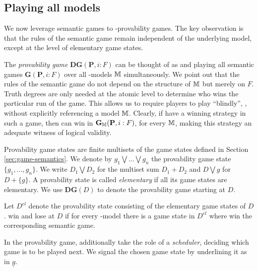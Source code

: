 \subsection{Playing all models}
We now leverage semantic games to \PNL-provability games. The key observation is that the rules of the semantic game remain independent of the underlying model, except at the level of elementary game states.

The {\em provability game}
$\mathbf{DG}(\mathbf{P},i:F )$ can be thought of as \Me and \You playing all
semantic games $\mathbf{G}(\mathbf{P},i:F )$ over all \PNL-models $\mathbb{M}$
simultaneously. We point out that  the rules of the semantic game do not depend on the structure
of $\mathbb{M}$ but merely on $F $. Truth degrees are only needed at the atomic level
to determine who wins the particular run of the game. This allows us to require
players to play ``blindly'', \ie, without explicitly referencing  a model $\mathbb{M}$.
Clearly, if \Ic have a winning strategy in such a game, then \Ic can win in
$\mathbf{G}_{\mathbb{M}}(\mathbf{P},i:F )$, for every $\mathbb{M}$, making this strategy an
adequate witness of logical validity. 

Provability game states are finite multisets of the game states
defined in Section \ref{sec:game-semantics}. We denote by $g_1 \bigvee ... \bigvee g_n$ 
 the provability game state $\{g_1,...,g_n\}$.
We write $D_1 \bigvee D_2$ for the
multiset sum $D_1+D_2$ and $D\bigvee g$ for $D+\{g\}$. A provability state is
called \emph{elementary} if all its game states are elementary.
We use $\mathbf{DG}(D)$ to denote the provability game starting at $D$. 

\begin{definition}\label{def:win}
Let $D^{el}$ denote the provability state consisting of the elementary game
states of $D$. \Ic win and \You lose at $D$ if for every \PNL-model there is
a game state in $D^{el}$ where \Ic win the corresponding semantic game. 
\end{definition}

In the provability game, \Ic additionally take the
role of a \emph{scheduler}, deciding which game  is to be played next. We
signal the chosen game state by underlining it as in $\underline{g}$.


